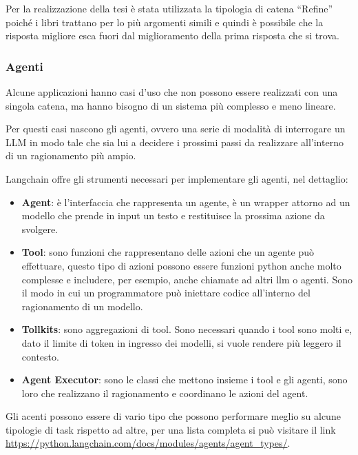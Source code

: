 Per la realizzazione della tesi è stata utilizzata la tipologia di catena ``Refine'' poiché i libri trattano per lo più argomenti simili e quindi è possibile che la risposta migliore esca fuori dal miglioramento della prima risposta che si trova.

\subsubsection*{Agenti}

Alcune applicazioni hanno casi d'uso che non possono essere realizzati con una singola catena, ma hanno bisogno di un sistema più complesso e meno lineare.

Per questi casi nascono gli agenti, ovvero una serie di modalità di interrogare un LLM in modo tale che sia lui a decidere i prossimi passi da realizzare all'interno di un ragionamento più ampio.

Langchain offre gli strumenti necessari per implementare gli agenti, nel dettaglio:

\begin{itemize}
    \item \textbf{Agent}: è l'interfaccia che rappresenta un agente, è un wrapper attorno ad un modello che prende in input un testo e restituisce la prossima azione da svolgere.
    \item \textbf{Tool}: sono funzioni che rappresentano delle azioni che un agente può effettuare, questo tipo di azioni possono essere funzioni python anche molto complesse e includere, per esempio, anche chiamate ad altri llm o agenti. Sono il modo in cui un programmatore può iniettare codice all'interno del ragionamento di un modello.
    \item \textbf{Tollkits}: sono aggregazioni di tool. Sono necessari quando i tool sono molti e, dato il limite di token in ingresso dei modelli, si vuole rendere più leggero il contesto.
    \item \textbf{Agent Executor}: sono le classi che mettono insieme i tool e gli agenti, sono loro che realizzano il ragionamento e coordinano le azioni del agent.
\end{itemize}

Gli acenti possono essere di vario tipo che possono performare meglio su alcune tipologie di task rispetto ad altre, per una lista completa si può visitare il link \url{https://python.langchain.com/docs/modules/agents/agent_types/}.